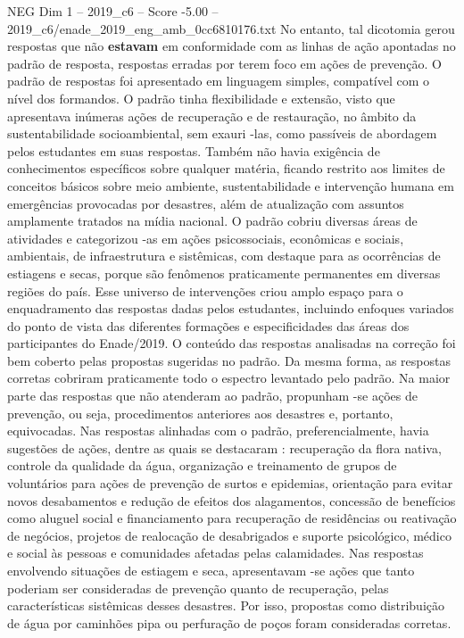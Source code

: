 \begin{textsample}{NEG Dim 1 – 2019\_c6 – Score -5.00 – 2019\_c6/enade\_2019\_eng\_amb\_0cc6810176.txt}
No entanto, tal dicotomia gerou respostas que não \textbf{estavam} em conformidade com as linhas de ação apontadas no padrão de resposta, respostas erradas por terem foco em ações de prevenção.
O padrão de respostas foi apresentado em linguagem simples, compatível com o nível dos formandos.
O padrão tinha flexibilidade e extensão, visto que apresentava inúmeras ações de recuperação e de restauração, no âmbito da sustentabilidade socioambiental, sem exauri -las, como passíveis de abordagem pelos estudantes em suas respostas.
Também não havia exigência de conhecimentos específicos sobre qualquer matéria, ficando restrito aos limites de conceitos básicos sobre meio ambiente, sustentabilidade e intervenção humana em emergências provocadas por desastres, além de atualização com assuntos amplamente tratados na mídia nacional.
O padrão cobriu diversas áreas de atividades e categorizou -as em ações psicossociais, econômicas e sociais, ambientais, de infraestrutura e sistêmicas, com destaque para as ocorrências de estiagens e secas, porque são fenômenos praticamente permanentes em diversas regiões do país.
Esse universo de intervenções criou amplo espaço para o enquadramento das respostas dadas pelos estudantes, incluindo enfoques variados do ponto de vista das diferentes formações e especificidades das áreas dos participantes do Enade/2019.
O conteúdo das respostas analisadas na correção foi bem coberto pelas propostas sugeridas no padrão.
Da mesma forma, as respostas corretas cobriram praticamente todo o espectro levantado pelo padrão.
Na maior parte das respostas que não atenderam ao padrão, propunham -se ações de prevenção, ou seja, procedimentos anteriores aos desastres e, portanto, equivocadas.
Nas respostas alinhadas com o padrão, preferencialmente, havia sugestões de ações, dentre as quais se destacaram : recuperação da flora nativa, controle da qualidade da água, organização e treinamento de grupos de voluntários para ações de prevenção de surtos e epidemias, orientação para evitar novos desabamentos e redução de efeitos dos alagamentos, concessão de benefícios como aluguel social e financiamento para recuperação de residências ou reativação de negócios, projetos de realocação de desabrigados e suporte psicológico, médico e social às pessoas e comunidades afetadas pelas calamidades.
Nas respostas envolvendo situações de estiagem e seca, apresentavam -se ações que tanto poderiam ser consideradas de prevenção quanto de recuperação, pelas características sistêmicas desses desastres.
Por isso, propostas como distribuição de água por caminhões pipa ou perfuração de poços foram consideradas corretas.

\end{textsample}

